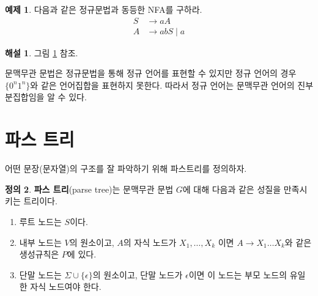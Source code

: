 \documentclass[b5paper, 11pt]{book}
\theoremstyle{definition}
\newtheorem{defn}{정의}[chapter]
\newtheorem{ex}[defn]{예제}
\newtheorem*{ans*}{해설}
\begin{document}
\begin{ex}
   다음과 같은 정규문법과 동등한 NFA를 구하라.
   \begin{align*}
       S & \rightarrow aA \\ 
       A & \rightarrow abS \; \vert \; a 
   \end{align*} 
\end{ex}
\begin{ans*}
    그림 \ref{regular grammar} 참조.
\end{ans*}
\begin{figure}[!ht]
    \centering
    \caption{} 
    \label{regular grammar}
\end{figure}
문맥무관 문법은 정규문법을 통해 정규 언어를 표현할 수 있지만 정규 언어의 경우 $\{0^n1^n\}$와 같은 언어집합을 표현하지 못한다. 따라서 정규 언어는 문맥무관 언어의 진부분집합임을 알 수 있다. 
\section{파스 트리}
어떤 문장(문자열)의 구조를 잘 파악하기 위해 파스트리를 정의하자.
\begin{defn}
    \textbf{파스 트리}(parse tree)는 문맥무관 문법 $G$에 대해 다음과 같은 성질을
    만족시키는 트리이다.
    \begin{enumerate}
        \item 루트 노드는 $S$이다.
        \item 내부 노드는 $V$의 원소이고, $A$의 자식 노드가 
        $X_1, \ldots, X_k $ 이면
        $A \rightarrow X_1 \ldots X_k$와 같은 생성규칙은 $P$에 있다. 
        \item 단말 노드는 $\Sigma \cup \{\epsilon\}$의 원소이고, 단말 노드가 $\epsilon$이면
        이 노드는 부모 노드의 유일한 자식 노드여야 한다. 
    \end{enumerate}
\end{defn}
\end{document}
